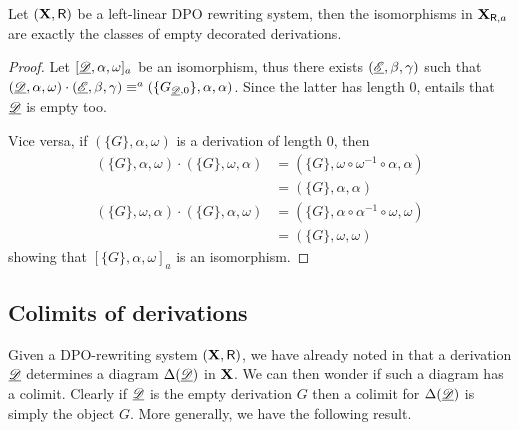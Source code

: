 \begin{proposition} Let $(\textbf {\textup{X}}, \mathsf{R})$ be a left-linear DPO rewriting system, then the isomorphisms in $\textbf {\textup{X}}_{\mathsf{R}, a}$ are exactly the classes of empty decorated derivations.
\end{proposition}
\begin{proof}
	Let $[\underline{\mathscr{D}}, \alpha, \omega]_a$ be an isomorphism, thus there exists $(\underline{\mathscr{E}}, \beta, \gamma)$ such that $(\underline{\mathscr{D}}, \alpha, \omega)\cdot (\underline{\mathscr{E}}, \beta, \gamma)\equiv^a(\{G_{\underline{\mathscr{D}}, 0}\}, \alpha, \alpha)$. Since the latter has length $0$,  entails that $\underline{\mathscr{D}}$ is empty too.
	
	Vice versa, if $(\{G\}, \alpha, \omega)$ is a derivation of length $0$, then 
	\begin{align*}
	(\{G\}, \alpha, \omega) \cdot (\{G\}, \omega, \alpha)&=(\{G\}, \omega\circ \omega^{-1} \circ \alpha, \alpha )\\&=(\{G\}, \alpha, \alpha)\\
	(\{G\}, \omega, \alpha) \cdot (\{G\}, \alpha, \omega)&=(\{G\}, \alpha\circ \alpha^{-1} \circ \omega, \omega )\\&=(\{G\}, \omega, \omega)
	\end{align*}
	showing that  $[\{G\}, \alpha, \omega]_a$ is an isomorphism.
\end{proof}

\subsection{Colimits of derivations}\label{subsec:col}
Given a DPO-rewriting system $(\textbf {\textup{X}}, \mathsf{R})$,  we have already noted in  that a derivation $\underline{\mathscr{D}}$  determines a diagram $\Delta(\underline{\mathscr{D}})$ in $\textbf {\textup{X}}$. We can then wonder if such a diagram has a colimit. Clearly if $\underline{\mathscr{D}}$ is the empty derivation $G$ then a colimit for $\Delta(\underline{\mathscr{D}})$ is simply the object $G$. More generally, we have the following result.

